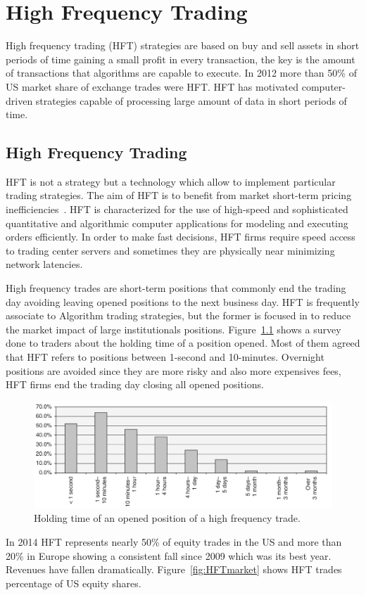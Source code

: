 \chapter{High Frequency Trading}

High frequency trading (HFT) strategies are based on buy and sell assets in
short periods of time gaining a small profit in every transaction, the key is
the amount of transactions that algorithms are capable to execute. 
In 2012 more than 50\% of US market share of exchange trades were HFT.  HFT has
motivated computer-driven strategies capable of processing large amount of data
in short periods of time. 


\section{High Frequency Trading}

HFT is not a strategy but a technology which allow to implement particular
trading strategies. The aim of HFT is to benefit from market short-term pricing
inefficiencies~\cite{chlistalla2011}. HFT is characterized for the use of
high-speed and sophisticated quantitative and algorithmic computer applications
for modeling and executing orders efficiently. In order to make fast decisions,
HFT firms require speed access to trading center servers and sometimes they are
physically near minimizing network latencies.

High frequency trades are short-term positions that commonly end the trading
day avoiding leaving opened positions to the next business day. HFT is
frequently associate to Algorithm trading strategies, but the former is focused
in to reduce the market impact of large institutionals positions.
Figure~\ref{fig:HFTtimes} shows a survey done to traders about the holding time
of a position opened. Most of them agreed that HFT refers to positions between
1-second and 10-minutes. Overnight positions are avoided since they are more
risky and also more expensives fees, HFT firms end the trading day closing all
opened positions.
\begin{figure}[!h]
  \centering
  \includegraphics[width=\textwidth]{img/HFTtradestime}
  \caption{Holding time of an opened position of a high frequency trade.}
  \label{fig:HFTtimes}
\end{figure}
In 2014 HFT represents nearly 50\% of equity trades in the US and more than 20\%
in Europe showing a consistent fall since 2009 which was its best year. Revenues
have fallen dramatically.
Figure~\ref{fig:HFTmarket} shows HFT trades percentage of US equity shares.


